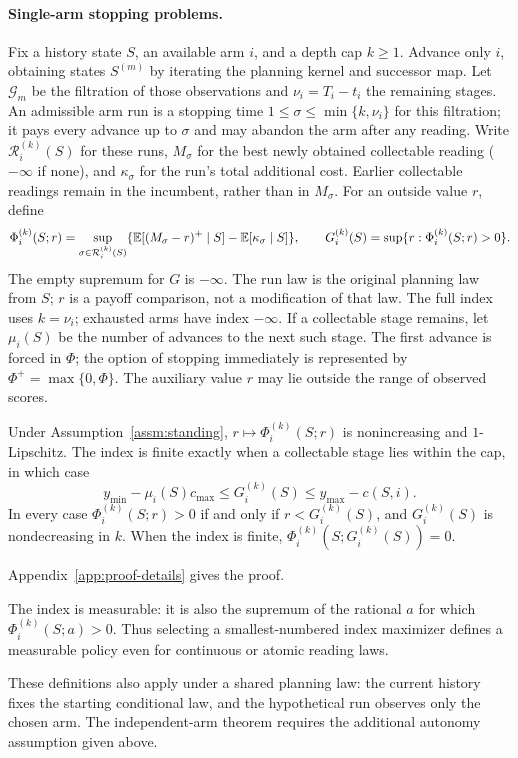 \paragraph{Single-arm stopping problems.}
Fix a history state $S$, an available arm $i$, and a depth cap $k\ge1$. Advance only $i$,
obtaining states $S^{(m)}$ by iterating the planning kernel and successor map. Let
$\mathcal G_m$ be the filtration of those observations and $\nu_i=T_i-t_i$ the remaining
stages. An admissible arm run is a stopping time $1\le\sigma\le\min\{k,\nu_i\}$ for this
filtration; it pays every advance up to $\sigma$ and may abandon the arm after any reading.
Write $\mathcal R_i^{(k)}(S)$ for these runs, $M_\sigma$ for the best newly obtained
collectable reading ($-\infty$ if none), and $\kappa_\sigma$ for the run's total
additional cost. Earlier collectable readings remain in the incumbent, rather
than in $M_\sigma$. For an outside value $r$, define
\[
\Phi_i^{(k)}(S;r)=\sup_{\sigma\in\mathcal R_i^{(k)}(S)}
\{\mathbb{E}[(M_\sigma-r)^+\mid S]-\mathbb{E}[\kappa_\sigma\mid S]\},\qquad
G_i^{(k)}(S)=\sup\{r:\Phi_i^{(k)}(S;r)>0\}.
\]
The empty supremum for $G$ is $-\infty$. The run law is the original planning law from $S$;
$r$ is a payoff comparison, not a modification of that law. The full index uses $k=\nu_i$;
exhausted arms have index $-\infty$. If a collectable stage remains, let $\mu_i(S)$ be the
number of advances to the next such stage. The first advance is forced in $\Phi$; the option
of stopping immediately is represented by $\Phi^+=\max\{0,\Phi\}$. The auxiliary value $r$
may lie outside the range of observed scores.

\begin{proposition}\label{prop:index}
Under Assumption~\ref{assm:standing}, $r\mapsto\Phi_i^{(k)}(S;r)$ is nonincreasing and
$1$-Lipschitz. The index is finite exactly when a collectable stage lies within the cap, in
which case
\[
y_{\min}-\mu_i(S)c_{\max}\le G_i^{(k)}(S)\le y_{\max}-c(S,i).
\]
In every case $\Phi_i^{(k)}(S;r)>0$ if and only if $r<G_i^{(k)}(S)$, and $G_i^{(k)}(S)$ is
nondecreasing in $k$. When the index is finite, $\Phi_i^{(k)}(S;G_i^{(k)}(S))=0$.
\end{proposition}
Appendix~\ref{app:proof-details} gives the proof.

The index is measurable: it is also the supremum of the rational $a$ for which
$\Phi_i^{(k)}(S;a)>0$. Thus selecting a smallest-numbered index maximizer defines a measurable
policy even for continuous or atomic reading laws.

These definitions also apply under a shared planning law: the current history fixes the
starting conditional law, and the hypothetical run observes only the chosen arm. The
independent-arm theorem requires the additional autonomy assumption given above.
